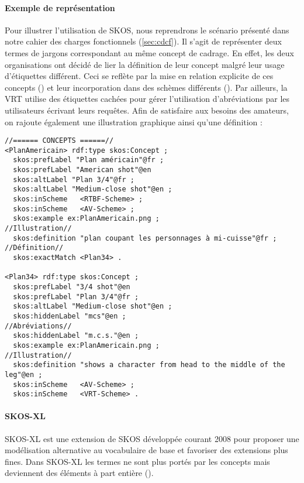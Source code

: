 \paragraph{Exemple de représentation} 
Pour illustrer l'utilisation de SKOS, nous reprendrons le scénario présenté dans notre cahier des charges fonctionnels (\ref{sec:cdcf}). 
Il s'agit de représenter deux termes de jargons correspondant au même concept de cadrage.
En effet, les deux organisations ont décidé de lier la définition de leur concept malgré leur usage d'étiquettes différent. 
Ceci se reflète par la mise en relation explicite de ces concepts () et leur incorporation dans des schèmes différents ().
Par ailleurs, la VRT utilise des étiquettes cachées pour gérer l'utilisation d'abréviations par les utilisateurs écrivant leurs requêtes. 
Afin de satisfaire aux besoins des amateurs, on rajoute également une illustration graphique ainsi qu'une définition :
\begin{Verbatim}[fontsize=\small,formatcom=\color{black!70}]
//====== CONCEPTS ======//
<PlanAmericain> rdf:type skos:Concept ; 
  skos:prefLabel "Plan américain"@fr ;
  skos:prefLabel "American shot"@en
  skos:altLabel "Plan 3/4"@fr ;
  skos:altLabel "Medium-close shot"@en ;
  skos:inScheme   <RTBF-Scheme> ;
  skos:inScheme   <AV-Scheme> ;
  skos:example ex:PlanAmericain.png ;                               //Illustration//
  skos:definition "plan coupant les personnages à mi-cuisse"@fr ;   //Définition//
  skos:exactMatch <Plan34> .
   
<Plan34> rdf:type skos:Concept ;
  skos:prefLabel "3/4 shot"@en
  skos:prefLabel "Plan 3/4"@fr ;
  skos:altLabel "Medium-close shot"@en ;
  skos:hiddenLabel "mcs"@en ;                                       //Abréviations//
  skos:hiddenLabel "m.c.s."@en ;
  skos:example ex:PlanAmericain.png ;                               //Illustration//
  skos:definition "shows a character from head to the middle of the leg"@en ;
  skos:inScheme   <AV-Scheme> ;
  skos:inScheme   <VRT-Scheme> .
\end{Verbatim}



\paragraph{SKOS-XL}\label{sec:skos-xl}
SKOS-XL est une extension de SKOS développée courant 2008 pour proposer une modélisation alternative au vocabulaire de base et favoriser des extensions plus fines. 
Dans SKOS-XL les termes ne sont plus portés par les concepts mais deviennent des éléments à part entière (). 

